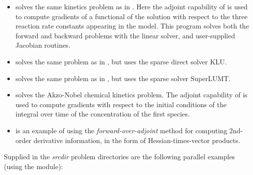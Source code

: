 \begin{itemize}

\item {}
  solves the same kinetics problem as in .
  \newline
  Here the adjoint capability of {\idas} is used to compute gradients
  of a functional of the solution with respect to the three
  reaction rate constants appearing in the model.
  This program solves both the forward and backward problems with the 
  {\sunlinsoldense} linear solver, and user-supplied Jacobian routines.

\item {}
  solves the same problem as in , but
  uses the sparse direct solver KLU.

\item {}
  solves the same problem as in , but
  uses the sparse solver SuperLUMT.

\item {}
  solves the Akzo-Nobel chemical kinetics problem.
  \newline
  The adjoint capability of {\idas} is used to compute gradients with
  respect to the initial conditions of the integral over time of the 
  concentration of the first species.


\item {}
  is an example of using the {\em forward-over-adjoint} method for
  computing 2nd-order derivative information, in the form of Hessian-times-vector
  products.

\end{itemize}


\vspace{0.2in}\noindent 
Supplied in the {\em srcdir} problem directories are
the following parallel examples (using the {\nvecp} module):

